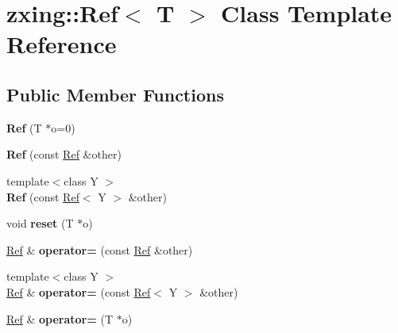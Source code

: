 \hypertarget{classzxing_1_1_ref}{}\section{zxing\+:\+:Ref$<$ T $>$ Class Template Reference}
\label{classzxing_1_1_ref}
\subsection*{Public Member Functions}
\begin{DoxyCompactItemize}
\item 
\mbox{\label{classzxing_1_1_ref_a2f2a343c1f522b75a5a80cd143fdc629}} 
{\bfseries Ref} (T $\ast$o=0)
\item 
\mbox{\label{classzxing_1_1_ref_a1217ca2370b19eb3e73146006ec65ba4}} 
{\bfseries Ref} (const \mbox{\hyperlink{classzxing_1_1_ref}{Ref}} \&other)
\item 
\mbox{\label{classzxing_1_1_ref_a2522ed57a7e3a4de1b3eb99fe84b7ccf}} 
{\footnotesize template$<$class Y $>$ }\\{\bfseries Ref} (const \mbox{\hyperlink{classzxing_1_1_ref}{Ref}}$<$ Y $>$ \&other)
\item 
\mbox{\label{classzxing_1_1_ref_a90833cff762be860adf57ec99213ea6f}} 
void {\bfseries reset} (T $\ast$o)
\item 
\mbox{\label{classzxing_1_1_ref_a3eabb7dfb15e6be1e201ef1c0abd637e}} 
\mbox{\hyperlink{classzxing_1_1_ref}{Ref}} \& {\bfseries operator=} (const \mbox{\hyperlink{classzxing_1_1_ref}{Ref}} \&other)
\item 
\mbox{\label{classzxing_1_1_ref_acfc5ae0dcbf646eb604da92c48a9073a}} 
{\footnotesize template$<$class Y $>$ }\\\mbox{\hyperlink{classzxing_1_1_ref}{Ref}} \& {\bfseries operator=} (const \mbox{\hyperlink{classzxing_1_1_ref}{Ref}}$<$ Y $>$ \&other)
\item 
\mbox{\label{classzxing_1_1_ref_aa548c0115f100a9801664a999e514672}} 
\mbox{\hyperlink{classzxing_1_1_ref}{Ref}} \& {\bfseries operator=} (T $\ast$o)

\end{DoxyCompactItemize}
